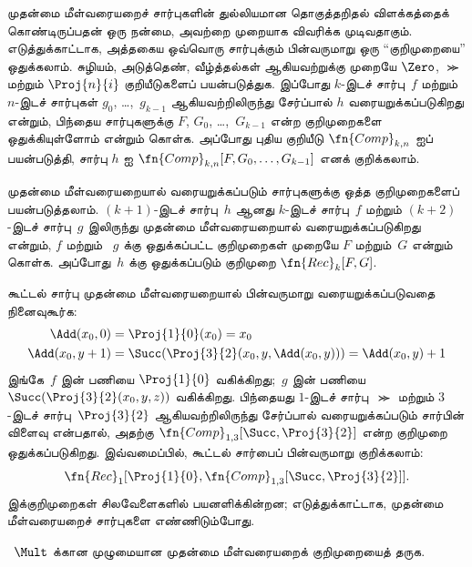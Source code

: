 \documentclass[../../../include/open-logic-section]{subfiles}
\begin{document}


முதன்மை மீள்வரையறைச் சார்புகளின் துல்லியமான தொகுத்தறிதல் விளக்கத்தைக்
கொண்டிருப்பதன் ஒரு நன்மை, அவற்றை முறையாக விவரிக்க முடிவதாகும்.
எடுத்துக்காட்டாக, அத்தகைய ஒவ்வொரு சார்புக்கும் பின்வருமாறு ஒரு
“குறிமுறையை” ஒதுக்கலாம். சுழியம், அடுத்தெண், வீழ்த்தல்கள் ஆகியவற்றுக்கு
முறையே $\Zero$, $\Succ$ மற்றும் $\Proj{n}{i}$ குறியீடுகளைப் பயன்படுத்துக.
இப்போது $k$-இடச் சார்பு~$f$ மற்றும் $n$-இடச் சார்புகள் $g_0$,
\dots,~$g_{k-1}$ ஆகியவற்றிலிருந்து சேர்ப்பால் $h$
வரையறுக்கப்படுகிறது என்றும், பிந்தைய சார்புகளுக்கு $F$, $G_0$,
\dots,~$G_{k-1}$ என்ற குறிமுறைகளை ஒதுக்கியுள்ளோம் என்றும் கொள்க.
அப்போது புதிய குறியீடு $\fn{Comp}_{k,n}$ ஐப் பயன்படுத்தி,
சார்பு $h$ ஐ $\fn{Comp}_{k,n}[F,G_0,\dots,G_{k-1}]$ எனக் குறிக்கலாம்.

முதன்மை மீள்வரையறையால் வரையறுக்கப்படும் சார்புகளுக்கு ஒத்த
குறிமுறைகளைப் பயன்படுத்தலாம். $(k+1)$-இடச் சார்பு~$h$ ஆனது
$k$-இடச் சார்பு~$f$ மற்றும் $(k+2)$-இடச் சார்பு~$g$ இலிருந்து
முதன்மை மீள்வரையறையால் வரையறுக்கப்படுகிறது என்றும், $f$ மற்றும்
~$g$ க்கு ஒதுக்கப்பட்ட குறிமுறைகள் முறையே $F$ மற்றும்~$G$
என்றும் கொள்க. அப்போது~$h$ க்கு ஒதுக்கப்படும் குறிமுறை
$\fn{Rec}_k[F,G]$.

கூட்டல் சார்பு முதன்மை மீள்வரையறையால் பின்வருமாறு வரையறுக்கப்படுவதை
நினைவுகூர்க:
\begin{align*}
  \Add(x_0, 0) & = \Proj{1}{0}(x_0) = x_0\\
  \Add(x_0, y+1) & = \Succ(\Proj{3}{2}(x_0, y, \Add(x_0, y))) = \Add(x_0, y) +1
\end{align*}
இங்கே~$f$ இன் பணியை $\Proj{1}{0}$ வகிக்கிறது;~$g$ இன் பணியை
$\Succ(\Proj{3}{2}(x_0, y, z))$ வகிக்கிறது. பிந்தையது
$1$-இடச் சார்பு~$\Succ$ மற்றும் $3$-இடச் சார்பு~$\Proj{3}{2}$
ஆகியவற்றிலிருந்து சேர்ப்பால் வரையறுக்கப்படும் சார்பின் விளைவு என்பதால்,
அதற்கு $\fn{Comp}_{1,3}[\Succ,\Proj{3}{2}]$ என்ற குறிமுறை
ஒதுக்கப்படுகிறது. இவ்வமைப்பில், கூட்டல் சார்பைப் பின்வருமாறு குறிக்கலாம்:
\[
\fn{Rec}_1[\Proj{1}{0},\fn{Comp}_{1,3}[\Succ,\Proj{3}{2}]].
\]
இக்குறிமுறைகள் சிலவேளைகளில் பயனளிக்கின்றன; எடுத்துக்காட்டாக,
முதன்மை மீள்வரையறைச் சார்புகளை எண்ணிடும்போது.

\begin{prob}
  ~$\Mult$ க்கான முழுமையான முதன்மை மீள்வரையறைக் குறிமுறையைத் தருக.
\end{prob}
\end{document}
